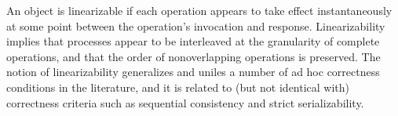 An object is linearizable if each operation appears
to take effect instantaneously at some point between the operation’s invocation
and response. Linearizability implies that processes appear to be interleaved
at the granularity of complete operations, and that the order of
nonoverlapping operations is preserved. The notion of linearizability generalizes and uniles a number of ad hoc correctness conditions in the literature, and it is related to (but not identical with) correctness criteria such as sequential consistency and strict serializability.
 
 
%
%
%
%
%
%
%
\vspace{1cm}




